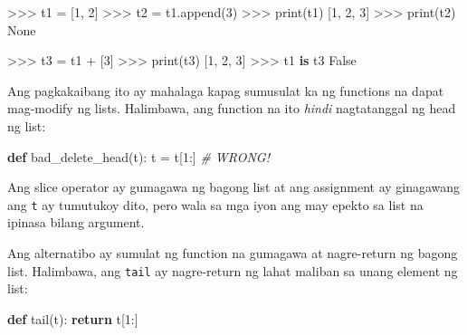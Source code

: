 \documentclass[10pt,]{book}
\newenvironment{Shaded}{}{}
\newcommand{\BuiltInTok}[1]{\textcolor[rgb]{0.00,0.50,0.00}{#1}}
\newcommand{\CommentTok}[1]{\textcolor[rgb]{0.38,0.63,0.69}{\textit{#1}}}
\newcommand{\ControlFlowTok}[1]{\textcolor[rgb]{0.00,0.44,0.13}{\textbf{#1}}}
\newcommand{\DecValTok}[1]{\textcolor[rgb]{0.25,0.63,0.44}{#1}}
\newcommand{\KeywordTok}[1]{\textcolor[rgb]{0.00,0.44,0.13}{\textbf{#1}}}
\newcommand{\NormalTok}[1]{#1}
\newcommand{\OperatorTok}[1]{\textcolor[rgb]{0.40,0.40,0.40}{#1}}
\newcommand{\VariableTok}[1]{\textcolor[rgb]{0.10,0.09,0.49}{#1}}
\begin{document}
\begin{Shaded}
\begin{Highlighting}[]
\OperatorTok{\textgreater{}\textgreater{}\textgreater{}}\NormalTok{ t1 }\OperatorTok{=}\NormalTok{ [}\DecValTok{1}\NormalTok{, }\DecValTok{2}\NormalTok{]}
\OperatorTok{\textgreater{}\textgreater{}\textgreater{}}\NormalTok{ t2 }\OperatorTok{=}\NormalTok{ t1.append(}\DecValTok{3}\NormalTok{)}
\OperatorTok{\textgreater{}\textgreater{}\textgreater{}} \BuiltInTok{print}\NormalTok{(t1)}
\NormalTok{[}\DecValTok{1}\NormalTok{, }\DecValTok{2}\NormalTok{, }\DecValTok{3}\NormalTok{]}
\OperatorTok{\textgreater{}\textgreater{}\textgreater{}} \BuiltInTok{print}\NormalTok{(t2)}
\VariableTok{None}

\OperatorTok{\textgreater{}\textgreater{}\textgreater{}}\NormalTok{ t3 }\OperatorTok{=}\NormalTok{ t1 }\OperatorTok{+}\NormalTok{ [}\DecValTok{3}\NormalTok{]}
\OperatorTok{\textgreater{}\textgreater{}\textgreater{}} \BuiltInTok{print}\NormalTok{(t3)}
\NormalTok{[}\DecValTok{1}\NormalTok{, }\DecValTok{2}\NormalTok{, }\DecValTok{3}\NormalTok{]}
\OperatorTok{\textgreater{}\textgreater{}\textgreater{}}\NormalTok{ t1 }\KeywordTok{is}\NormalTok{ t3}
\VariableTok{False}
\end{Highlighting}
\end{Shaded}

Ang pagkakaibang ito ay mahalaga kapag sumusulat ka ng functions na
dapat mag-modify ng lists. Halimbawa, ang function na ito \emph{hindi}
nagtatanggal ng head ng list:

\begin{Shaded}
\begin{Highlighting}[]
\KeywordTok{def}\NormalTok{ bad\_delete\_head(t):}
\NormalTok{    t }\OperatorTok{=}\NormalTok{ t[}\DecValTok{1}\NormalTok{:]              }\CommentTok{\# WRONG!}
\end{Highlighting}
\end{Shaded}

Ang slice operator ay gumagawa ng bagong list at ang assignment ay
ginagawang ang \texttt{t} ay tumutukoy dito, pero wala sa mga iyon ang
may epekto sa list na ipinasa bilang argument.

 

Ang alternatibo ay sumulat ng function na gumagawa at nagre-return ng
bagong list. Halimbawa, ang \texttt{tail} ay nagre-return ng lahat
maliban sa unang element ng list:

\begin{Shaded}
\begin{Highlighting}[]
\KeywordTok{def}\NormalTok{ tail(t):}
    \ControlFlowTok{return}\NormalTok{ t[}\DecValTok{1}\NormalTok{:]}
\end{Highlighting}
\end{Shaded}
\end{document}
